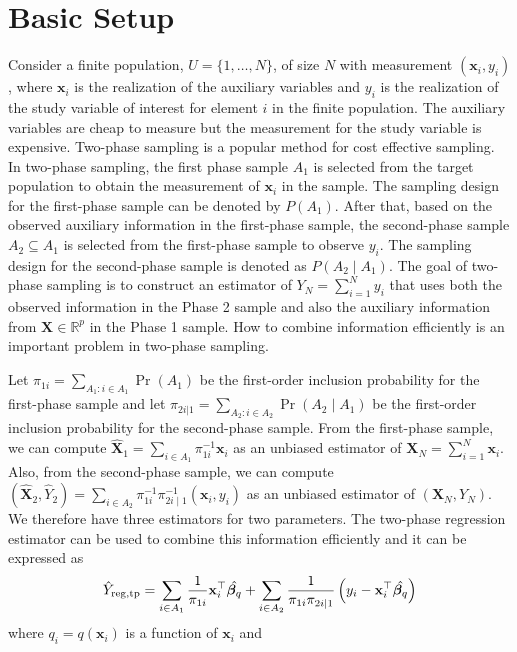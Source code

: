 \documentclass[12pt]{article}
\newcommand{\bx}{\mathbf{x}}
\newcommand{\R}{\mathbb{R}}
\renewcommand{\bf}[1]{\mathbf{#1}}
\begin{document}
\newpage 

\section{Basic Setup}

Consider a finite population, $U = \{1, \dots, N\}$, of size $N$ 
with measurement  $(\bx_i, y_i)$, where $\bx_i$ is the realization of the
auxiliary variables and $y_i$ is the realization of the study variable of
interest for element  $i$ in the finite population. The auxiliary variables are
cheap to measure but the measurement for the study variable is expensive.
Two-phase sampling is a popular method for cost effective sampling.
In two-phase sampling, the first phase sample $A_1$  is selected from the
target population to obtain the measurement of $\bx_i$ in the sample. The
sampling design for the first-phase sample can be denoted by $P(A_1)$. After
that, based on the observed auxiliary information in the first-phase  sample,
the second-phase sample $A_2 \subseteq A_1$ is selected from the first-phase
sample to observe $y_i$. The sampling design for the second-phase sample is
denoted as $P( A_2 \mid A_1)$.  
The
goal of two-phase sampling is to construct an estimator of $Y_N =  \sum_{i=1}^N y_i$ 
that uses both the observed information in the Phase 2 sample and also the 
auxiliary information from $\bf X \in \R^p$ in the Phase 1 sample. How to
combine information efficiently is an important problem in two-phase sampling. 

Let $\pi_{1i} = \sum_{A_1: i \in A_1} \Pr(A_1)$ be the first-order inclusion
probability for the first-phase sample and let $\pi_{2i | 1} = \sum_{A_2: i \in
A_2} \Pr(A_2 \mid A_1)$ be the first-order inclusion probability for the
second-phase sample. From the first-phase sample, we can compute
$\widehat{\mathbf{X}}_1 = \sum_{i \in A_1} \pi_{1i}^{-1} \bx_i$ as an unbiased
estimator of $\mathbf{X}_N = \sum_{i=1}^N  \bx_i$. Also, from the second-phase
sample, we can compute $\left( \widehat{\mathbf{X}}_2 , \hat{Y}_2 \right) =
\sum_{i \in A_2} \pi_{1i}^{-1} \pi_{2i \mid 1}^{-1} \left( \bx_i, y_i\right)$ as
an unbiased estimator of $(\mathbf{X}_N, Y_N)$.
We therefore have three estimators for
two parameters. The two-phase regression estimator can be  used to combine this
information efficiently and it can be expressed as  
\begin{equation} \label{eq:1}
\hat Y_{\rm reg, tp} 
= \sum_{i \in A_1} \frac{1}{\pi_{1i}} \bf x_i^\top  \hat{\bm \beta_q} + 
\sum_{i \in A_2} \frac{1}{\pi_{1i}\pi_{2i|1}} \left(y_i - \bf x_i^\top  \hat{\bm \beta_q}\right)
\end{equation}  
where $q_i = q(\bf x_i)$  is a function of $\bf x_i$ and  
\end{document}
